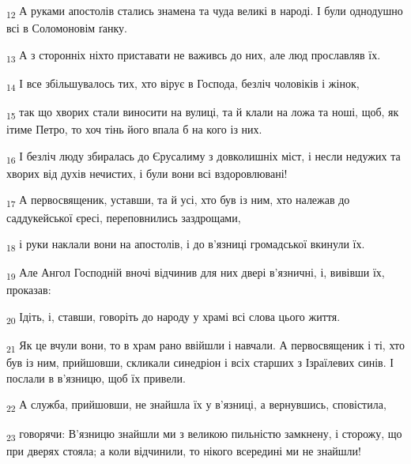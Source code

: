\begin{tcolorbox}
\textsubscript{12} А руками апостолів стались знамена та чуда великі в народі. І були однодушно всі в Соломоновім ґанку.
\end{tcolorbox}
\begin{tcolorbox}
\textsubscript{13} А з сторонніх ніхто приставати не важивсь до них, але люд прославляв їх.
\end{tcolorbox}
\begin{tcolorbox}
\textsubscript{14} І все збільшувалось тих, хто вірує в Господа, безліч чоловіків і жінок,
\end{tcolorbox}
\begin{tcolorbox}
\textsubscript{15} так що хворих стали виносити на вулиці, та й клали на ложа та ноші, щоб, як ітиме Петро, то хоч тінь його впала б на кого із них.
\end{tcolorbox}
\begin{tcolorbox}
\textsubscript{16} І безліч люду збиралась до Єрусалиму з довколишніх міст, і несли недужих та хворих від духів нечистих, і були вони всі вздоровлювані!
\end{tcolorbox}
\begin{tcolorbox}
\textsubscript{17} А первосвященик, уставши, та й усі, хто був із ним, хто належав до саддукейської єресі, переповнились заздрощами,
\end{tcolorbox}
\begin{tcolorbox}
\textsubscript{18} і руки наклали вони на апостолів, і до в'язниці громадської вкинули їх.
\end{tcolorbox}
\begin{tcolorbox}
\textsubscript{19} Але Ангол Господній вночі відчинив для них двері в'язничні, і, вивівши їх, проказав:
\end{tcolorbox}
\begin{tcolorbox}
\textsubscript{20} Ідіть, і, ставши, говоріть до народу у храмі всі слова цього життя.
\end{tcolorbox}
\begin{tcolorbox}
\textsubscript{21} Як це вчули вони, то в храм рано ввійшли і навчали. А первосвященик і ті, хто був із ним, прийшовши, скликали синедріон і всіх старших з Ізраїлевих синів. І послали в в'язницю, щоб їх привели.
\end{tcolorbox}
\begin{tcolorbox}
\textsubscript{22} А служба, прийшовши, не знайшла їх у в'язниці, а вернувшись, сповістила,
\end{tcolorbox}
\begin{tcolorbox}
\textsubscript{23} говорячи: В'язницю знайшли ми з великою пильністю замкнену, і сторожу, що при дверях стояла; а коли відчинили, то нікого всередині ми не знайшли!
\end{tcolorbox}
